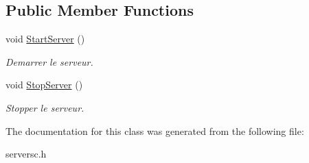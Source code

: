 \subsection*{Public Member Functions}
\begin{DoxyCompactItemize}
\item 
void \hyperlink{classServerSC_a52e32a2100f99d8b6c16ffece88ee633}{Start\+Server} ()\hypertarget{classServerSC_a52e32a2100f99d8b6c16ffece88ee633}{}\label{classServerSC_a52e32a2100f99d8b6c16ffece88ee633}

\begin{DoxyCompactList}\small\item\em Demarrer le serveur. \end{DoxyCompactList}\item 
void \hyperlink{classServerSC_a1272d2b6654fcaa3668f02cdac58846d}{Stop\+Server} ()\hypertarget{classServerSC_a1272d2b6654fcaa3668f02cdac58846d}{}\label{classServerSC_a1272d2b6654fcaa3668f02cdac58846d}

\begin{DoxyCompactList}\small\item\em Stopper le serveur. \end{DoxyCompactList}\end{DoxyCompactItemize}


The documentation for this class was generated from the following file\+:\begin{DoxyCompactItemize}
\item 
serversc.\+h\end{DoxyCompactItemize}
